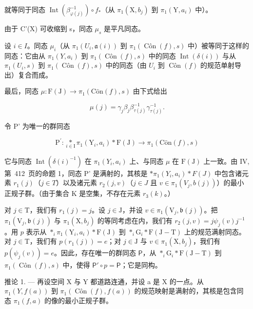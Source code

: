 就等同于同态 \(\operatorname{Int}(\beta_{\varphi(j)}^{-1}) \circ f_*\)（从 \(\pi_1(\mathrm{X}, b_j)\) 到 \(\pi_1(\mathrm{Y}, a_i)\) 中）。

由于 C'(X) 可收缩到 s，同态 \(\mu_{s}\) 是平凡同态。

设 \(i \in I\)。同态 \(\mu_i\)（从 \(\pi_1(U_i, \mathfrak{a}(i))\) 到 \(\pi_1(\operatorname{Côn}(f), s)\) 中）被等同于这样的同态：它由从 \(\pi_1(Y, a_i)\) 到 \(\pi_1(\operatorname{Côn}(f), s)\) 中的同态 \(\operatorname{Int}(\delta(i))\) 与从 \(\pi_1(U_i, s)\) 到 \(\pi_1(\operatorname{Côn}(f), s)\) 中的同态（由 \(U_i\) 到 \(\operatorname{Côn}(f) \) 的规范单射导出）复合而成。

最后，同态 \(\mu\colon\mathrm{F}(\mathrm{J})\to\pi_{1}(\mathrm{C}\hat{\mathrm{o}}\mathrm{n}(f),s)\) 由下式给出

\[
\mu (j) = \gamma_ {j} \beta_ {j} \beta_ {\tau (j)} ^ {- 1} \gamma_ {\tau (j)} ^ {- 1}.
\]

令 P' 为唯一的群同态

\[
\mathrm{P} ^ {\prime} \colon \underset {i \in \mathrm{I}} {*} \pi_ {1} (\mathrm{Y} _ {i}, a _ {i}) * \mathrm{F} (\mathrm{J}) \to \pi_ {1} (\mathrm{C} \hat {\mathrm{o}} \mathrm{n} (f), s)
\]

它与同态 \(\operatorname{Int}(\delta(i)^{-1})\) 在 \(\pi_1(Y_i, a_i)\) 上、与同态 \(\mu\) 在 \(\mathrm{F}(\mathrm{J})\) 上一致。由 IV, 第~412~页的命题 1，同态 P' 是满射的，其核是 \(*\pi_1(Y_i, a_i) * F(J)\) 中包含诸元素 \(r_1(j)\)（\(j \in T\)）以及诸元素 \(r_{2}(j, v)\)（\(j \in J\) 且 \(v \in \pi_{1}(V_{j}, b(j))\)）的最小正规子群。（由于集合 K 是空集，不存在元素 \(r_{3}(k)\)。）

对 \(j \in \mathrm{T}\)，我们有 \(r_1(j) = j\)。设 \(j \in \mathrm{J}\)，并设 \(v \in \pi_1(\mathrm{V}_j, \mathfrak{b}(j))\)。把 \(\pi_1(\mathrm{V}_j, \mathfrak{b}(j))\) 与 \(\pi_1(\mathrm{X}, b_j)\) 的等同考虑在内，我们有 \(r_2(j, v) = j\psi_j(v)j^{-1}\)。用 \(p\) 表示从 \(*_{i}\pi_1(\mathrm{Y}_i, a_i) * \mathrm{F}(\mathrm{J})\) 到 \(*_{i}\mathrm{G}_{i} * \mathrm{F}(\mathrm{J} - \mathrm{T})\) 上的规范满射同态。对 \(j \in \mathrm{T}\)，我们有 \(p(r_1(j)) = e\)；对 \(j \in \mathrm{J}\) 与 \(v \in \pi_1(\mathrm{X}, b_j)\)，我们有 \(p(\psi_j(v)) = e\)。因此，存在唯一的群同态 \(\mathsf{P}\)，从 \(*_{i}\mathrm{G}_{i} * \mathrm{F}(\mathrm{J} - \mathrm{T})\) 到 \(\pi_1(\operatorname{Côn}(f), s)\) 中，使得 \(\mathsf{P}' \circ p = \mathsf{P}\)；它是同构。

推论 1. --- 再设空间 X 与 Y 都道路连通，并设 a 是 X 的一点。从 \(\pi_1(Y, f(a))\) 到 \(\pi_1(\operatorname{Côn}(f), f(a))\) 的规范映射是满射的，其核是包含同态 \(\pi_1(f, a)\) 的像的最小正规子群。

